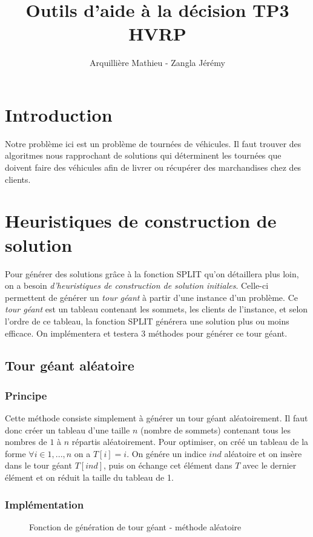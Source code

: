 \documentclass{article}
\title{Outils d'aide à la décision TP3\\HVRP}
\author{Arquillière Mathieu - Zangla Jérémy}
\date{}
\begin{document}
\begin{titlepage}
  \maketitle
\end{titlepage}

\tableofcontents
\newpage
\listoffigures
\listofalgorithms
\newpage

\section{Introduction}
Notre problème ici est un problème de tournées de véhicules. Il faut trouver des algoritmes
nous rapprochant de solutions qui déterminent les tournées que doivent faire des véhicules
afin de livrer ou récupérer des marchandises chez des clients.

\section{Heuristiques de construction de solution}
Pour générer des solutions grâce à la fonction SPLIT qu'on détaillera plus loin, on a
besoin \emph{d'heuristiques de construction de solution initiales}. Celle-ci permettent
de générer un \emph{tour géant} à partir d'une instance d'un problème. Ce \emph{tour géant}
est un tableau contenant les sommets, les clients de l'instance, et selon l'ordre
de ce tableau, la fonction SPLIT générera une solution plus ou moins efficace. On
implémentera et testera 3 méthodes pour générer ce tour géant.

\subsection{Tour géant aléatoire}
\subsubsection{Principe}
Cette méthode consiste simplement à générer un tour géant aléatoirement. Il faut donc
créer un tableau d'une taille $n$ (nombre de sommets) contenant tous les nombres de
$1$ à $n$ répartis aléatoirement. Pour optimiser, on créé un tableau de la forme
$\forall i \in 1,...,n$ on a $T[i] = i$. On génére un indice $ind$ aléatoire et on insère
dans le tour géant $T[ind]$, puis on échange cet élément dans $T$ avec le dernier élément
et on réduit la taille du tableau de 1.

\subsubsection{Implémentation}
\begin{figure}[!ht]
  \centering
  \caption{Fonction de génération de tour géant - méthode aléatoire}
  
\end{figure}
\end{document}
